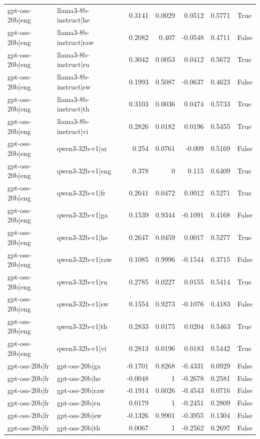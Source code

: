 \begin{table}
\begin{tabular}{l l r r r r l}
gpt-oss-20b|eng & llama3-8b-instruct|he & 0.3141 & 0.0029 & 0.0512 & 0.5771 & True \\
gpt-oss-20b|eng & llama3-8b-instruct|raw & 0.2082 & 0.407 & -0.0548 & 0.4711 & False \\
gpt-oss-20b|eng & llama3-8b-instruct|ru & 0.3042 & 0.0053 & 0.0412 & 0.5672 & True \\
gpt-oss-20b|eng & llama3-8b-instruct|sw & 0.1993 & 0.5087 & -0.0637 & 0.4623 & False \\
gpt-oss-20b|eng & llama3-8b-instruct|th & 0.3103 & 0.0036 & 0.0474 & 0.5733 & True \\
gpt-oss-20b|eng & llama3-8b-instruct|vi & 0.2826 & 0.0182 & 0.0196 & 0.5455 & True \\
gpt-oss-20b|eng & qwen3-32b-v1|ar & 0.254 & 0.0761 & -0.009 & 0.5169 & False \\
gpt-oss-20b|eng & qwen3-32b-v1|eng & 0.378 & 0 & 0.115 & 0.6409 & True \\
gpt-oss-20b|eng & qwen3-32b-v1|fr & 0.2641 & 0.0472 & 0.0012 & 0.5271 & True \\
gpt-oss-20b|eng & qwen3-32b-v1|ga & 0.1539 & 0.9344 & -0.1091 & 0.4168 & False \\
gpt-oss-20b|eng & qwen3-32b-v1|he & 0.2647 & 0.0459 & 0.0017 & 0.5277 & True \\
gpt-oss-20b|eng & qwen3-32b-v1|raw & 0.1085 & 0.9996 & -0.1544 & 0.3715 & False \\
gpt-oss-20b|eng & qwen3-32b-v1|ru & 0.2785 & 0.0227 & 0.0155 & 0.5414 & True \\
gpt-oss-20b|eng & qwen3-32b-v1|sw & 0.1554 & 0.9273 & -0.1076 & 0.4183 & False \\
gpt-oss-20b|eng & qwen3-32b-v1|th & 0.2833 & 0.0175 & 0.0204 & 0.5463 & True \\
gpt-oss-20b|eng & qwen3-32b-v1|vi & 0.2813 & 0.0196 & 0.0183 & 0.5442 & True \\
gpt-oss-20b|fr & gpt-oss-20b|ga & -0.1701 & 0.8268 & -0.4331 & 0.0929 & False \\
gpt-oss-20b|fr & gpt-oss-20b|he & -0.0048 & 1 & -0.2678 & 0.2581 & False \\
gpt-oss-20b|fr & gpt-oss-20b|raw & -0.1914 & 0.6026 & -0.4543 & 0.0716 & False \\
gpt-oss-20b|fr & gpt-oss-20b|ru & 0.0179 & 1 & -0.2451 & 0.2809 & False \\
gpt-oss-20b|fr & gpt-oss-20b|sw & -0.1326 & 0.9901 & -0.3955 & 0.1304 & False \\
gpt-oss-20b|fr & gpt-oss-20b|th & 0.0067 & 1 & -0.2562 & 0.2697 & False \\

\end{tabular}
\end{table}
